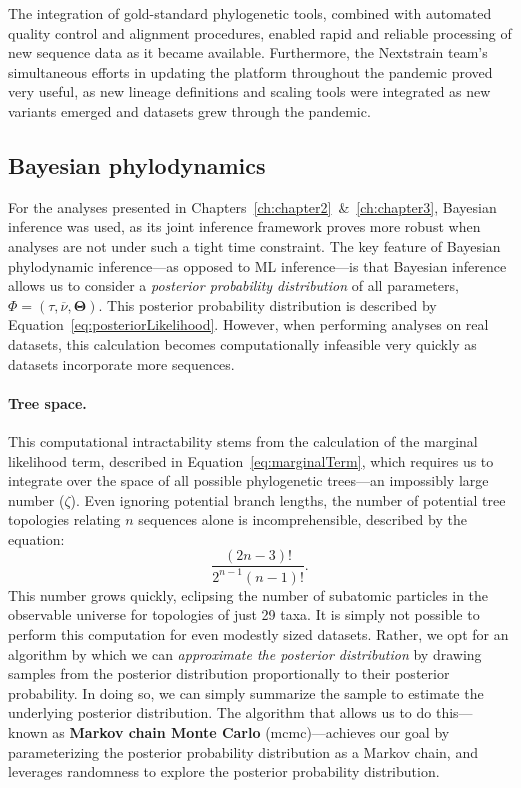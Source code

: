 The integration of gold-standard phylogenetic tools, combined with automated quality control and alignment procedures, enabled rapid and reliable processing of new sequence data as it became available.
Furthermore, the Nextstrain team's simultaneous efforts in updating the platform throughout the pandemic proved very useful, as new lineage definitions and scaling tools were integrated as new variants emerged and datasets grew through the pandemic.

\subsection{Bayesian phylodynamics}
For the analyses presented in Chapters~\ref{ch:chapter2}~\&~\ref{ch:chapter3}, Bayesian inference was used, as its joint inference framework proves more robust when analyses are not under such a tight time constraint.
The key feature of Bayesian phylodynamic inference---as opposed to ML inference---is that Bayesian inference allows us to consider a \textit{posterior probability distribution} of all parameters, $\Phi = (\tau,\overline{\nu},\mathbf{\Theta})$.
This posterior probability distribution is described by Equation~\ref{eq:posteriorLikelihood}.
However, when performing analyses on real datasets, this calculation becomes computationally infeasible very quickly as datasets incorporate more sequences.

\paragraph*{Tree space.}
This computational intractability stems from the calculation of the marginal likelihood term, described in Equation~\ref{eq:marginalTerm}, which requires us to integrate over the space of all possible phylogenetic trees---an impossibly large number ($\zeta$).
Even ignoring potential branch lengths, the number of potential tree topologies relating $n$ sequences alone is incomprehensible, described by the equation:
\begin{equation}
  \label{eq:treeSpace}
  \frac{(2n-3)!}{2^{n-1}(n-1)!}.
\end{equation}
This number grows quickly, eclipsing the number of subatomic particles in the observable universe \citep{padilla2022fantastic} for topologies of just 29 taxa.
It is simply not possible to perform this computation for even modestly sized datasets.
Rather, we opt for an algorithm by which we can \textit{approximate the posterior distribution} by drawing samples from the posterior distribution proportionally to their posterior probability.
In doing so, we can simply summarize the sample to estimate the underlying posterior distribution.
The algorithm that allows us to do this---known as \textbf{Markov chain Monte Carlo} (\gls{mcmc})---achieves our goal by parameterizing the posterior probability distribution as a Markov chain, and leverages randomness to explore the posterior probability distribution.

